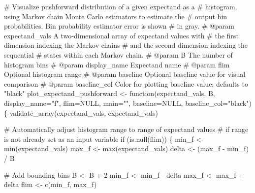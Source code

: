 \documentclass[
  letterpaper,
  DIV=11,
  numbers=noendperiod]{scrartcl}
\newenvironment{Shaded}{\begin{snugshade}}{\end{snugshade}}
\newcommand{\BuiltInTok}[1]{\textcolor[rgb]{0.00,0.23,0.31}{#1}}
\newcommand{\CommentTok}[1]{\textcolor[rgb]{0.37,0.37,0.37}{#1}}
\newcommand{\ControlFlowTok}[1]{\textcolor[rgb]{0.00,0.23,0.31}{#1}}
\newcommand{\DecValTok}[1]{\textcolor[rgb]{0.68,0.00,0.00}{#1}}
\newcommand{\KeywordTok}[1]{\textcolor[rgb]{0.00,0.23,0.31}{#1}}
\newcommand{\NormalTok}[1]{\textcolor[rgb]{0.00,0.23,0.31}{#1}}
\newcommand{\OperatorTok}[1]{\textcolor[rgb]{0.37,0.37,0.37}{#1}}
\newcommand{\StringTok}[1]{\textcolor[rgb]{0.13,0.47,0.30}{#1}}
\begin{document}
\begin{Shaded}
\begin{Highlighting}[]
\CommentTok{\# Visualize pushforward distribution of a given expectand as a }
\CommentTok{\# histogram, using Markov chain Monte Carlo estimators to estimate the }
\CommentTok{\# output bin probabilities.  Bin probability estimator error is shown }
\CommentTok{\# in gray.}
\CommentTok{\# @param expectand\_vals A two{-}dimensional array of expectand values with}
\CommentTok{\#                       the first dimension indexing the Markov chains}
\CommentTok{\#                       and the second dimension indexing the sequential}
\CommentTok{\#                       states within each Markov chain.}
\CommentTok{\# @param B The number of histogram bins}
\CommentTok{\# @param display\_name Expectand name}
\CommentTok{\# @param flim Optional histogram range}
\CommentTok{\# @param baseline Optional baseline value for visual comparison}
\CommentTok{\# @param baseline\_col Color for plotting baseline value; defaults to "black"}
\NormalTok{plot\_expectand\_pushforward }\OperatorTok{\textless{}{-}}\NormalTok{ function(expectand\_vals, B,}
\NormalTok{                                       display\_name}\OperatorTok{=}\StringTok{"f"}\NormalTok{,}
\NormalTok{                                       flim}\OperatorTok{=}\NormalTok{NULL, main}\OperatorTok{=}\StringTok{""}\NormalTok{, }
\NormalTok{                                       baseline}\OperatorTok{=}\NormalTok{NULL,}
\NormalTok{                                       baseline\_col}\OperatorTok{=}\StringTok{"black"}\NormalTok{) \{}
\NormalTok{  validate\_array(expectand\_vals, }\StringTok{\textquotesingle{}expectand\_vals\textquotesingle{}}\NormalTok{)}
  
  \CommentTok{\# Automatically adjust histogram range to range of expectand values}
  \CommentTok{\# if range is not already set as an input variable}
  \ControlFlowTok{if}\NormalTok{ (}\KeywordTok{is}\NormalTok{.null(flim)) \{}
\NormalTok{    min\_f }\OperatorTok{\textless{}{-}} \BuiltInTok{min}\NormalTok{(expectand\_vals)}
\NormalTok{    max\_f }\OperatorTok{\textless{}{-}} \BuiltInTok{max}\NormalTok{(expectand\_vals)}
\NormalTok{    delta }\OperatorTok{\textless{}{-}}\NormalTok{ (max\_f }\OperatorTok{{-}}\NormalTok{ min\_f) }\OperatorTok{/}\NormalTok{ B}
    
    \CommentTok{\# Add bounding bins}
\NormalTok{    B }\OperatorTok{\textless{}{-}}\NormalTok{ B }\OperatorTok{+} \DecValTok{2}
\NormalTok{    min\_f }\OperatorTok{\textless{}{-}}\NormalTok{ min\_f }\OperatorTok{{-}}\NormalTok{ delta}
\NormalTok{    max\_f }\OperatorTok{\textless{}{-}}\NormalTok{ max\_f }\OperatorTok{+}\NormalTok{ delta}
\NormalTok{    flim }\OperatorTok{\textless{}{-}}\NormalTok{ c(min\_f, max\_f)}
    

\end{Highlighting}
\end{Shaded}
\end{document}
